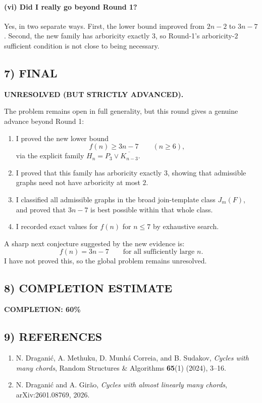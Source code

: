 \paragraph{(vi) Did I really go beyond Round 1?}
Yes, in two separate ways.
First, the lower bound improved from $2n-2$ to $3n-7$.
Second, the new family has arboricity exactly $3$, so Round-1's arboricity-$2$ sufficient condition is not close to being necessary.

\subsection*{7) FINAL}
\textbf{UNRESOLVED (BUT STRICTLY ADVANCED).}

The problem remains open in full generality, but this round gives a genuine advance beyond Round 1:

\begin{enumerate}
\item I proved the new lower bound
\[
f(n)\ge 3n-7\qquad (n\ge 6),
\]
via the explicit family $H_n=P_3\vee \overline{K_{n-3}}$.
\item I proved that this family has arboricity exactly $3$, showing that admissible graphs need not have arboricity at most $2$.
\item I classified all admissible graphs in the broad join-template class $J_m(F)$, and proved that $3n-7$ is best possible within that whole class.
\item I recorded exact values for $f(n)$ for $n\le 7$ by exhaustive search.
\end{enumerate}

A sharp next conjecture suggested by the new evidence is:
\[
f(n)=3n-7\qquad \text{for all sufficiently large }n.
\]
I have not proved this, so the global problem remains unresolved.

\subsection*{8) COMPLETION ESTIMATE}
\textbf{COMPLETION: 60\%}

\subsection*{9) REFERENCES}
\begin{enumerate}
\item N. Dragani\'c, A. Methuku, D. Munh\'a Correia, and B. Sudakov,
\emph{Cycles with many chords},
Random Structures \& Algorithms \textbf{65}(1) (2024), 3--16.

\item N. Dragani\'c and A. Gir\~ao,
\emph{Cycles with almost linearly many chords},
arXiv:2601.08769, 2026.
\end{enumerate}
